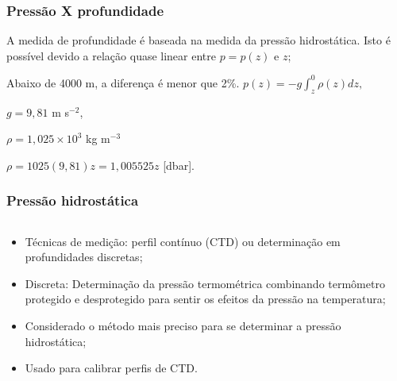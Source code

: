 \begin{frame}
\frametitle{Pressão X profundidade}
    \begin{block}{}
    A medida de profundidade é baseada na medida da pressão hidrostática.
    Isto é possível devido a relação quase linear entre $p = p(z)$ e $z$;
    \end{block}

    \pause
    \begin{block}{}
    Abaixo de 4000 m, a diferença é menor que 2\%.
    $p(z) = -g\int^0_z\rho(z)dz,$

    $g = 9,81$ m s$^{-2}$,

    $\rho = 1,025 \times 10^3$ kg m$^{-3}$

    $\rho = 1025 (9,81)z = 1,005525z$ [dbar].
    \end{block}
\end{frame}

\begin{frame}
\frametitle{Pressão hidrostática}
    \begin{columns}
        \begin{column}{0.7\textwidth}
        \small{
        \begin{itemize}[<+-| alert@+>]
            \item Técnicas de medição: perfil contínuo (CTD) ou determinação
                  em profundidades discretas;
            \item Discreta: Determinação da pressão termométrica combinando
                  termômetro protegido e desprotegido para sentir os efeitos
                  da pressão na temperatura;
            \item Considerado o método mais preciso para se determinar a
                  pressão hidrostática;
            \item Usado para calibrar perfis de CTD.
        \end{itemize}
        }
        \end{column}
    \begin{column}{0.3\textwidth}
    \begin{center}
    \end{center}
    \end{column}
    \end{columns}
\end{frame}

